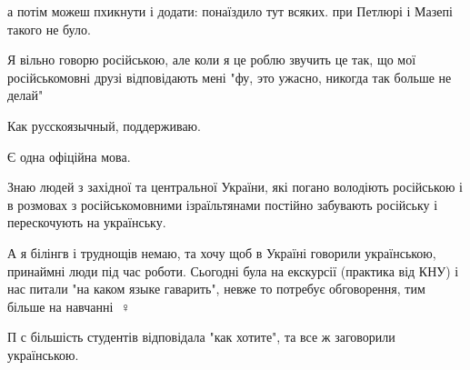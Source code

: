 \begin{itemize}
\begin{itemize}
 
а потім можеш пхикнути і додати: понаїздило тут всяких.
при Петлюрі і Мазепі такого не було.
\end{itemize}

 

Я вільно говорю російською, але коли я це роблю звучить це так, що мої
російськомовні друзі відповідають мені "фу, это ужасно, никогда так больше не
делай"


 
Как русскоязычный, поддерживаю.

Є одна офіційна мова.

Знаю людей з західної та центральної України, які погано володіють російською і
в розмовах з російськомовними ізраїльтянами постійно забувають російську і
перескочують на українську.


 

А я білінгв і труднощів немаю, та хочу щоб в Україні говорили українською,
принаймні люди під час роботи. Сьогодні була на екскурсії (практика від КНУ) і
нас питали "на каком языке гаварить", невже то потребує обговорення, тим більше
на навчанні 🤦♀️

П с більшість студентів відповідала "как хотите", та все ж заговорили українською.

 


\end{itemize}
